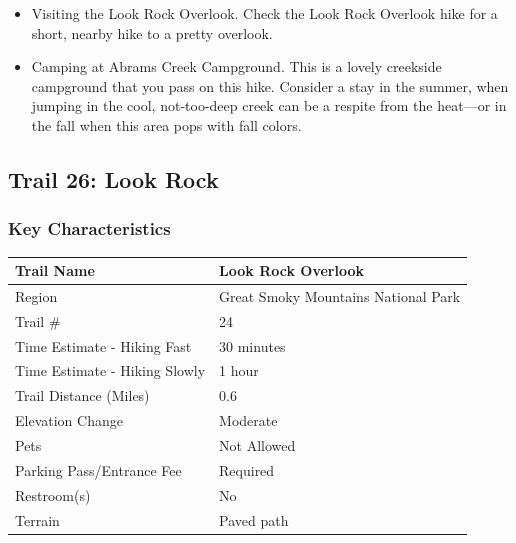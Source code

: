 \documentclass[
  letterpaper,
  DIV=11,
  numbers=noendperiod]{scrartcl}
\providecommand{\tightlist}{%
  \setlength{\itemsep}{0pt}\setlength{\parskip}{0pt}}\usepackage{longtable,booktabs,array}
\begin{document}
\begin{itemize}
\tightlist
\item
  Visiting the Look Rock Overlook. Check the Look Rock Overlook hike for
  a short, nearby hike to a pretty overlook.
\item
  Camping at Abrams Creek Campground. This is a lovely creekside
  campground that you pass on this hike. Consider a stay in the summer,
  when jumping in the cool, not-too-deep creek can be a respite from the
  heat---or in the fall when this area pops with fall colors.
\end{itemize}

\hypertarget{trail-26-look-rock}{%
\subsection{Trail 26: Look Rock}\label{trail-26-look-rock}}

\hypertarget{key-characteristics-25}{%
\subsubsection{Key Characteristics}\label{key-characteristics-25}}

\begin{longtable}[]{@{}ll@{}}
\toprule\noalign{}
Trail Name & Look Rock Overlook \\
\midrule\noalign{}
\endhead
\bottomrule\noalign{}
\endlastfoot
Region & Great Smoky Mountains National Park \\
Trail \# & 24 \\
Time Estimate - Hiking Fast & 30 minutes \\
Time Estimate - Hiking Slowly & 1 hour \\
Trail Distance (Miles) & 0.6 \\
Elevation Change & Moderate \\
Pets & Not Allowed \\
Parking Pass/Entrance Fee & Required \\
Restroom(s) & No \\
Terrain & Paved path \\
\end{longtable}
\end{document}
